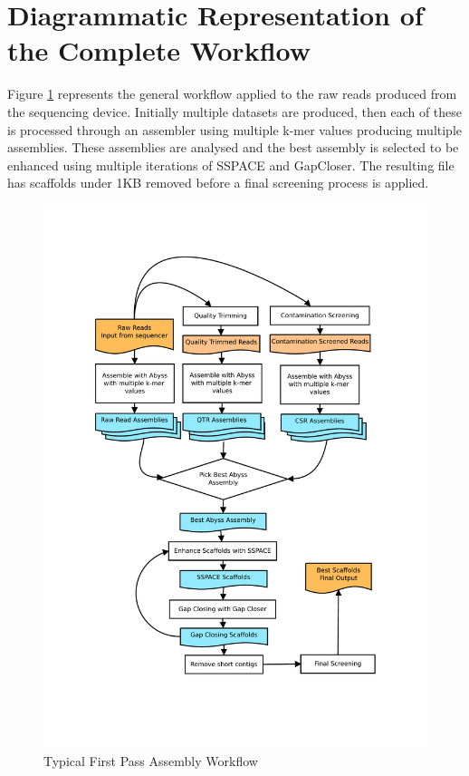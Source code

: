 \documentclass{amsart}
\begin{document}
\pagebreak
\newpage
\section{Diagrammatic Representation of the Complete Workflow}

Figure \ref{fig:workflow} represents the general workflow applied to the raw reads produced from the sequencing device.  Initially multiple datasets are produced, then each of these is processed through an assembler using multiple k-mer values producing multiple assemblies.  These assemblies are analysed and the best assembly is selected to be enhanced using multiple iterations of SSPACE and GapCloser.  The resulting file has scaffolds under 1KB removed before a final screening process is applied.

\begin{figure}[H]
\includegraphics[width=13cm]{Workflow.pdf}
\caption{Typical First Pass Assembly Workflow}
\label{fig:workflow}
\end{figure}
\end{document}

